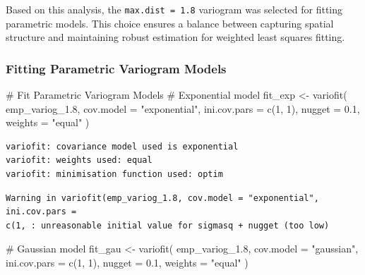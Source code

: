 \documentclass[
  11pt,
]{article}
\newenvironment{Shaded}{\begin{snugshade}}{\end{snugshade}}
\newcommand{\AttributeTok}[1]{\textcolor[rgb]{0.40,0.45,0.13}{#1}}
\newcommand{\CommentTok}[1]{\textcolor[rgb]{0.37,0.37,0.37}{#1}}
\newcommand{\DecValTok}[1]{\textcolor[rgb]{0.68,0.00,0.00}{#1}}
\newcommand{\FloatTok}[1]{\textcolor[rgb]{0.68,0.00,0.00}{#1}}
\newcommand{\FunctionTok}[1]{\textcolor[rgb]{0.28,0.35,0.67}{#1}}
\newcommand{\NormalTok}[1]{\textcolor[rgb]{0.00,0.23,0.31}{#1}}
\newcommand{\OtherTok}[1]{\textcolor[rgb]{0.00,0.23,0.31}{#1}}
\newcommand{\StringTok}[1]{\textcolor[rgb]{0.13,0.47,0.30}{#1}}
\begin{document}
Based on this analysis, the \texttt{max.dist\ =\ 1.8} variogram was
selected for fitting parametric models. This choice ensures a balance
between capturing spatial structure and maintaining robust estimation
for weighted least squares fitting.

\subsubsection{Fitting Parametric Variogram
Models}\label{fitting-parametric-variogram-models}

\begin{Shaded}
\begin{Highlighting}[]
\CommentTok{\#  Fit Parametric Variogram Models}
\CommentTok{\# Exponential model}
\NormalTok{fit\_exp }\OtherTok{\textless{}{-}} \FunctionTok{variofit}\NormalTok{(}
\NormalTok{  emp\_variog\_1}\FloatTok{.8}\NormalTok{,}
  \AttributeTok{cov.model =} \StringTok{"exponential"}\NormalTok{,}
  \AttributeTok{ini.cov.pars =} \FunctionTok{c}\NormalTok{(}\DecValTok{1}\NormalTok{, }\DecValTok{1}\NormalTok{),}
  \AttributeTok{nugget =} \FloatTok{0.1}\NormalTok{,}
  \AttributeTok{weights =} \StringTok{"equal"}
\NormalTok{)}
\end{Highlighting}
\end{Shaded}

\begin{verbatim}
variofit: covariance model used is exponential 
variofit: weights used: equal 
variofit: minimisation function used: optim 
\end{verbatim}

\begin{verbatim}
Warning in variofit(emp_variog_1.8, cov.model = "exponential", ini.cov.pars =
c(1, : unreasonable initial value for sigmasq + nugget (too low)
\end{verbatim}

\begin{Shaded}
\begin{Highlighting}[]
\CommentTok{\# Gaussian model}
\NormalTok{fit\_gau }\OtherTok{\textless{}{-}} \FunctionTok{variofit}\NormalTok{(}
\NormalTok{  emp\_variog\_1}\FloatTok{.8}\NormalTok{,}
  \AttributeTok{cov.model =} \StringTok{"gaussian"}\NormalTok{,}
  \AttributeTok{ini.cov.pars =} \FunctionTok{c}\NormalTok{(}\DecValTok{1}\NormalTok{, }\DecValTok{1}\NormalTok{),}
  \AttributeTok{nugget =} \FloatTok{0.1}\NormalTok{,}
  \AttributeTok{weights =} \StringTok{"equal"}
\NormalTok{)}
\end{Highlighting}
\end{Shaded}
\end{document}
